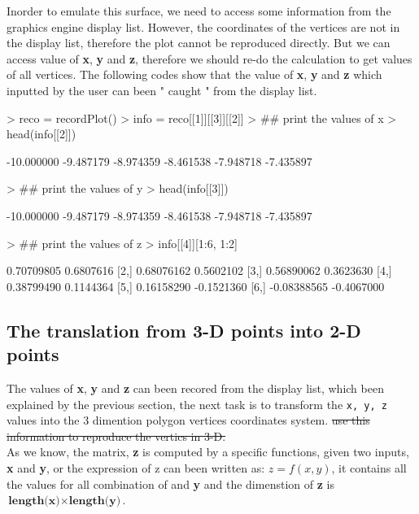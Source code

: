 \documentclass[paper=a4, fontsize=11pt]{report}
\begin{document}
Inorder to emulate this surface, we need to access some information from the graphics engine display list. However, the coordinates of the vertices are not in the display list, therefore the plot cannot be reproduced directly. But we can access value of \textbf{x}, \textbf{y} and \textbf{z}, therefore we should re-do the calculation to get values of all vertices. The following codes show that the value of \textbf{x}, \textbf{y} and \textbf{z} which inputted by the user can been " caught " from the display list.
\begin{Schunk}
\begin{Sinput}
> reco = recordPlot()
> info = reco[[1]][[3]][[2]]
> ## print the values of x
> head(info[[2]])
\end{Sinput}
\begin{Soutput}
[1] -10.000000  -9.487179  -8.974359  -8.461538  -7.948718  -7.435897
\end{Soutput}
\begin{Sinput}
> ## print the values of y
> head(info[[3]])
\end{Sinput}
\begin{Soutput}
[1] -10.000000  -9.487179  -8.974359  -8.461538  -7.948718  -7.435897
\end{Soutput}
\begin{Sinput}
> ## print the values of z
> info[[4]][1:6, 1:2]
\end{Sinput}
\begin{Soutput}
            [,1]       [,2]
[1,]  0.70709805  0.6807616
[2,]  0.68076162  0.5602102
[3,]  0.56890062  0.3623630
[4,]  0.38799490  0.1144364
[5,]  0.16158290 -0.1521360
[6,] -0.08388565 -0.4067000
\end{Soutput}
\end{Schunk}
\subsection{The translation from 3-D points into 2-D points}
The values of \textbf{x}, \textbf{y} and \textbf{z} can been recored from the display list, which been explained by the previous section, the next task is to transform the \texttt{x, y, z} values into the 3 dimention polygon vertices coordinates system.
\st{use this information to reproduce the vertics in 3-D.}\\

As we know, the matrix, \textbf{z} is computed by a specific functions, given two inputs, \textbf{x} and \textbf{y}, or the expression of z can been written as: $z = f(x,y)$, it contains all the values for all combination of  and \textbf{y} and the dimenstion of \textbf{z} is $ \textbf{length(x)} \times \textbf{length(y)}$.\\
\end{document}
